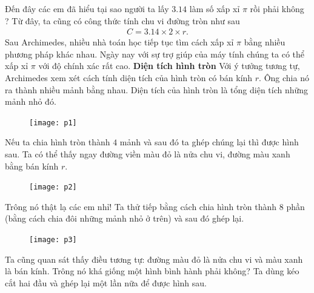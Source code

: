 \begin{multicols}{2}
	Đến đây các em đã hiểu tại sao người ta lấy $3{.}14$ làm số xấp xỉ $\pi$ rồi phải không ? Từ đây, ta cũng có công thức tính chu vi đường tròn như sau
	\begin{align*}
		C=3{.}14\times2\times r.
	\end{align*}
	Sau Archimedes, nhiều nhà toán học tiếp tục tìm cách xấp xỉ $\pi$  bằng nhiều phương pháp khác nhau. Ngày nay với sự trợ giúp của máy tính chúng ta có thể xấp xỉ $\pi$ với độ chính xác rất cao.
	\vskip 0.1cm
	\textbf{\color{toancuabi}Diện tích hình tròn}
	\vskip 0.1cm
	Với ý tưởng tương tự, Archimedes xem xét cách tính diện tích của hình tròn có bán kính $r$. Ông chia nó ra thành nhiều mảnh bằng nhau. Diện tích của  hình tròn là tổng diện tích những mảnh nhỏ đó.
	\begin{figure}[H]
		\vspace*{-5pt}
		\centering
		\captionsetup{labelformat= empty, justification=centering}
		\texttt{[image: p1]}
		\vspace*{-10pt}
	\end{figure}
	Nếu ta chia hình tròn thành $4$ mảnh và sau đó ta ghép chúng lại thì được hình sau. Ta có thể thấy ngay đường viền màu đỏ là nửa chu vi, đường màu xanh bằng bán kính $r$.
	\begin{figure}[H]
		\vspace*{-5pt}
		\centering
		\captionsetup{labelformat= empty, justification=centering}
		\texttt{[image: p2]}
		\vspace*{-10pt}
	\end{figure}
	Trông nó thật lạ các em nhỉ! Ta thử tiếp bằng cách chia hình tròn thành $8$ phần (bằng cách chia đôi những mảnh nhỏ ở trên) và sau đó ghép lại.
	\begin{figure}[H]
		\vspace*{5pt}
		\centering
		\captionsetup{labelformat= empty, justification=centering}
		\texttt{[image: p3]}
		\vspace*{-10pt}
	\end{figure}
	Ta cũng quan sát thấy điều tương tự: đường màu đỏ là nửa chu vi và màu xanh là bán kính. Trông nó khá giống một hình bình hành phải không? Ta dùng kéo cắt hai đầu và ghép lại một lần nữa để được hình sau.
	\begin{figure}[H]
		\vspace*{-5pt}

\end{figure}
\end{multicols}
